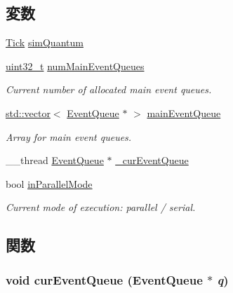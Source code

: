 \subsection*{変数}
\begin{DoxyCompactItemize}
\item 
\hyperlink{base_2types_8hh_a5c8ed81b7d238c9083e1037ba6d61643}{Tick} \hyperlink{eventq_8hh_a1184f025d31220089a3af9dfc6eeb4d4}{simQuantum}
\item 
\hyperlink{Type_8hh_a435d1572bf3f880d55459d9805097f62}{uint32\_\-t} \hyperlink{eventq_8hh_a0cb37c490e14c37cdcc040c2392feda1}{numMainEventQueues}
\begin{DoxyCompactList}\small\item\em Current number of allocated main event queues. \item\end{DoxyCompactList}\item 
\hyperlink{classstd_1_1vector}{std::vector}$<$ \hyperlink{classEventQueue}{EventQueue} $\ast$ $>$ \hyperlink{eventq_8hh_a75c22a9e4871574133dae986c0a4527e}{mainEventQueue}
\begin{DoxyCompactList}\small\item\em Array for main event queues. \item\end{DoxyCompactList}\item 
\_\-\_\-thread \hyperlink{classEventQueue}{EventQueue} $\ast$ \hyperlink{eventq_8hh_a2a77d1fcaf54c702b80ae9c02d588333}{\_\-curEventQueue}
\item 
bool \hyperlink{eventq_8hh_a1a48f421470ff3e6db2b119ab1286b96}{inParallelMode}
\begin{DoxyCompactList}\small\item\em Current mode of execution: parallel / serial. \item\end{DoxyCompactList}\end{DoxyCompactItemize}


\subsection{関数}
\hypertarget{eventq_8hh_aa002a8d75c873915e60d96ac255f9df7}{
\subsubsection[{curEventQueue}]{\setlength{\rightskip}{0pt plus 5cm}void curEventQueue ({\bf EventQueue} $\ast$ {\em q})}}
\label{eventq_8hh_aa002a8d75c873915e60d96ac255f9df7}



